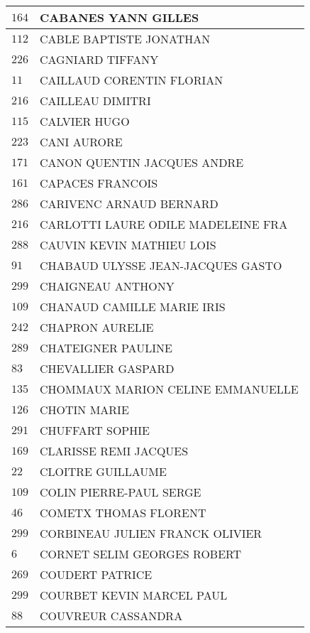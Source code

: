 \begin{xltabular}{\linewidth}{|l|X|}
    \hline
    $164$ & CABANES YANN GILLES \\
    \hline
    $112$ & CABLE BAPTISTE JONATHAN \\
    \hline
    $226$ & CAGNIARD TIFFANY \\
    \hline
    $11$ & CAILLAUD CORENTIN FLORIAN \\
    \hline
    $216$ & CAILLEAU DIMITRI \\
    \hline
    $115$ & CALVIER HUGO \\
    \hline
    $223$ & CANI AURORE \\
    \hline
    $171$ & CANON QUENTIN JACQUES ANDRE \\
    \hline
    $161$ & CAPACES FRANCOIS \\
    \hline
    $286$ & CARIVENC ARNAUD BERNARD \\
    \hline
    $216$ & CARLOTTI LAURE ODILE MADELEINE FRA \\
    \hline
    $288$ & CAUVIN KEVIN MATHIEU LOIS \\
    \hline
    $91$ & CHABAUD ULYSSE JEAN-JACQUES GASTO \\
    \hline
    $299$ & CHAIGNEAU ANTHONY \\
    \hline
    $109$ & CHANAUD CAMILLE MARIE IRIS \\
    \hline
    $242$ & CHAPRON AURELIE \\
    \hline
    $289$ & CHATEIGNER PAULINE \\
    \hline
    $83$ & CHEVALLIER GASPARD \\
    \hline
    $135$ & CHOMMAUX MARION CELINE EMMANUELLE \\
    \hline
    $126$ & CHOTIN MARIE \\
    \hline
    $291$ & CHUFFART SOPHIE \\
    \hline
    $169$ & CLARISSE REMI JACQUES \\
    \hline
    $22$ & CLOITRE GUILLAUME \\
    \hline
    $109$ & COLIN PIERRE-PAUL SERGE \\
    \hline
    $46$ & COMETX THOMAS FLORENT \\
    \hline
    $299$ & CORBINEAU JULIEN FRANCK OLIVIER \\
    \hline
    $6$ & CORNET SELIM GEORGES ROBERT \\
    \hline
    $269$ & COUDERT PATRICE \\
    \hline
    $299$ & COURBET KEVIN MARCEL PAUL \\
    \hline
    $88$ & COUVREUR CASSANDRA \\

\end{xltabular}
